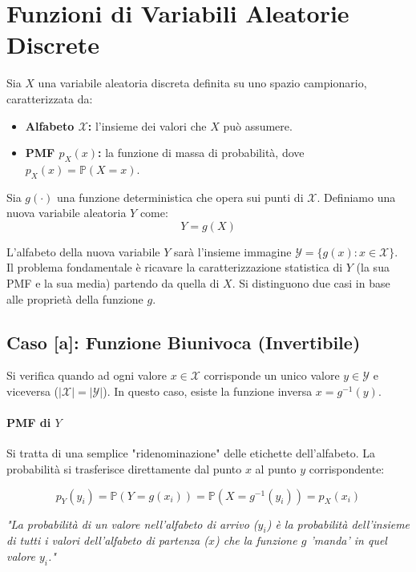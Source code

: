 \section{Funzioni di Variabili Aleatorie Discrete}

Sia $X$ una variabile aleatoria discreta definita su uno spazio campionario, caratterizzata da:
\begin{itemize}
    \item \textbf{Alfabeto $\mathcal{X}$:} l'insieme dei valori che $X$ può assumere.
    \item \textbf{PMF $p_X(x)$:} la funzione di massa di probabilità, dove $p_X(x) = \mathbb{P}(X = x)$.
\end{itemize}

Sia $g(\cdot)$ una funzione deterministica che opera sui punti di $\mathcal{X}$. Definiamo una nuova variabile aleatoria $Y$ come:
\[ Y = g(X) \]

L'alfabeto della nuova variabile $Y$ sarà l'insieme immagine $\mathcal{Y} = \{g(x) : x \in \mathcal{X}\}$.
\\Il problema fondamentale è ricavare la caratterizzazione statistica di $Y$ (la sua PMF e la sua media) partendo da quella di $X$. Si distinguono due casi in base alle proprietà della funzione $g$.

\subsection{Caso [a]: Funzione Biunivoca (Invertibile)}

Si verifica quando ad ogni valore $x \in \mathcal{X}$ corrisponde un unico valore $y \in \mathcal{Y}$ e viceversa ($|\mathcal{X}| = |\mathcal{Y}|$). In questo caso, esiste la funzione inversa $x = g^{-1}(y)$.

\paragraph{PMF di $Y$}
Si tratta di una semplice "ridenominazione" delle etichette dell'alfabeto. La probabilità si trasferisce direttamente dal punto $x$ al punto $y$ corrispondente:

\begin{equation}
\boxed{p_Y(y_i) = \mathbb{P}(Y = g(x_i)) = \mathbb{P}(X = g^{-1}(y_i)) = p_X(x_i)}
\end{equation}

\textit{"La probabilità di un valore nell'alfabeto di arrivo ($y_i$) è la probabilità dell'insieme di tutti i valori dell'alfabeto di partenza ($x$) che la funzione $g$ 'manda' in quel valore $y_i$."}


